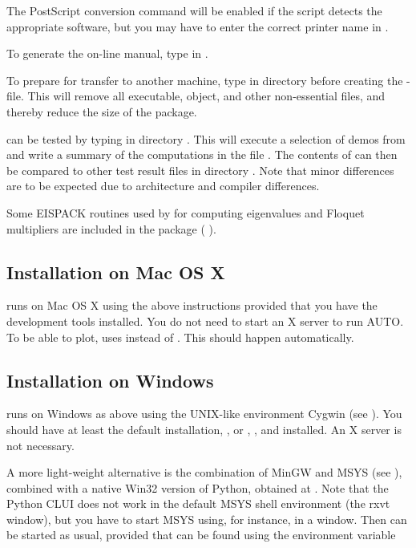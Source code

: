 The PostScript conversion command  will be enabled
if the  script detects the appropriate software,
but
you may have to enter the correct printer name in .

To generate the on-line manual, type  in .

To prepare \AUTO for transfer to another machine, type 
in directory  before creating the -file. 
This will remove all executable, object, and other non-essential files, and
thereby reduce the size of the package.

\AUTO can be tested by typing  in 
directory .
This will execute a selection of demos from  and write a
summary of the computations in the file .
The contents of  can then be compared to other test result files
in directory . Note that minor differences are
to be expected due to architecture and compiler differences.

Some {\cal EISPACK} routines used by \AUTO for computing eigenvalues and
Floquet multipliers are included in the package
( \citeyear{EISPACK:76}).

\subsection{Installation on Mac OS X}
\AUTO runs on Mac OS X using the above instructions provided that
you have the development tools
installed. You do not need to start an X server to run AUTO. To be able
to plot, \AUTO uses  instead of . This
should happen automatically.

\subsection{Installation on Windows}
\AUTO runs on Windows as above using the UNIX-like environment Cygwin
(see ). You should have at least the
default installation, ,  or , , and  installed.
An X server is not necessary.

A more light-weight alternative is the combination of MinGW and MSYS
(see ), combined with a native Win32
version of Python, obtained at . Note that
the Python CLUI does not work in the default MSYS shell environment
(the rxvt window), but you have to start MSYS using, for instance,
 in a 
window. Then  can be started as usual, provided that
 can be found using the environment variable

